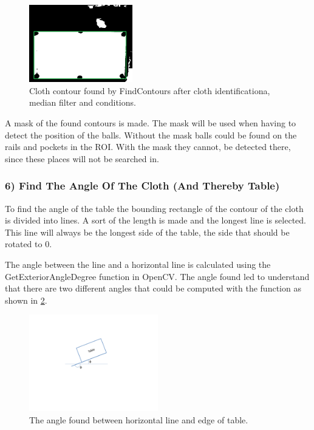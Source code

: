 \begin{figure}[H]
\begin{center}
\leavevmode
\includegraphics[width=0.4\textwidth]{images/clothcontour}
\end{center}
\caption{Cloth contour found by FindContours after cloth identificationa, median filter and conditions.}
\label{fig:clothcontour}
\end{figure}

A mask of the found contours is made. The mask will be used when having to detect the position of the balls. Without the mask balls could be found on the rails and pockets in the ROI. With the mask they cannot, be detected there, since these places will not be searched in.


\subsubsection{6) Find The Angle Of The Cloth (And Thereby Table)}
To find the angle of the table the bounding rectangle of the contour of the cloth is divided into lines. A sort of the length is made and the longest line is selected. This line will always be the longest side of the table, the side that should be rotated to 0\degree.

The angle between the line and a horizontal line is calculated using the GetExteriorAngleDegree function in OpenCV. The angle found led to understand that there are two different angles that could be computed with the function as shown in \ref{fig:table_angle}.

\begin{figure}[htpb]
\begin{center}
\leavevmode
\includegraphics[width=0.5\textwidth]{images/table_angle}
\end{center}
\caption{The angle found between horizontal line and edge of table.}
\label{fig:table_angle}
\end{figure}

